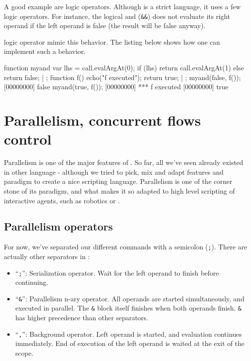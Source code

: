 A good example are logic operators. Although \Cxx is a strict
language, it uses a few logic operators. For instance, the logical and
(\lstinline{&&}) does not evaluate its right operand if the left
operand is false (the result will be false anyway).

\us logic operator mimic this behavior. The listing below shows how
one can implement such a behavior.

\begin{urbiscript}
function myand
{
  var lhs = call.evalArgAt(0);
  if (lhs)
    return call.evalArgAt(1)
  else
    return false;
} | {};
function f()
{
  echo("f executed");
  return true;
} | {};
myand(false, f());
[00000000] false
myand(true, f());
[00000000] *** f executed
[00000000] true
\end{urbiscript}


\chapter{Parallelism, concurrent flows control}

Parallelism is one of the major features of \us. So far, all we've
seen already existed in other language - although we tried to pick,
mix and adapt features and paradigm to create a nice scripting
language. Parallelism is one of the corner stone of its paradigm, and
what makes it so adapted to high level scripting of interactive
agents, such as robotics or \ai.

\section{Parallelism operators}

For now, we've separated our different commands with a semicolon
(\lstinline{;}). There are actually other separators in \us:

\begin{itemize}
\item ``\lstinline{;}'': Serialization operator. Wait for the left
  operand to finish before continuing.
\item ``\lstinline{&}'': Parallelism n-ary operator. All operands are
  started simultaneously, and executed in parallel. The \lstinline{&}
  block itself finishes when both operands finish. \lstinline{&} has
  higher precedence than other separators.
\item ``\lstinline{,}'': Background operator. Left operand is started,
  and evaluation continues immediately. End of execution of the left
  operand is waited at the exit of the scope.
\end{itemize}

